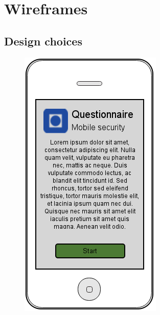 \section{Wireframes}

  \subsection{Design choices}

    \begin{figure}[H]
      \includegraphics[scale=0.5]{screens/v2/mobile/mobile1-1.png}
    \end{figure}

